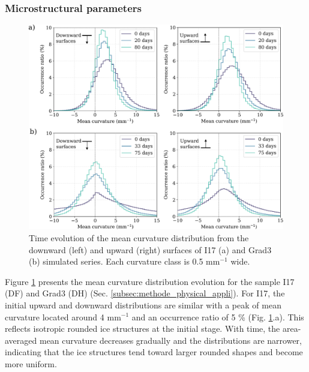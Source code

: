 \documentclass[draft,ms]{agujournal2019}
\begin{document}
\subsubsection{Microstructural parameters}

\begin{figure}
    \centering
    \includegraphics[width=\linewidth]{Figures/histo_i17_grad3_copie_invert.pdf}
    \caption{Time evolution of the mean curvature distribution from the downward (left) and upward (right) surfaces of I17 (a) and Grad3 (b) simulated series. Each curvature class is 0.5 mm$^{-1}$ wide.}
    \label{fig:histo_i17_grad3}
\end{figure}

Figure \ref{fig:histo_i17_grad3} presents the mean curvature distribution evolution for the sample I17 (DF) and Grad3 (DH) (Sec. \ref{subsec:methode_physical_appli}). For I17, the initial upward and downward distributions are similar with a peak of mean curvature located around 4 mm$^{-1}$ and an occurrence ratio of 5 \% (Fig. \ref{fig:histo_i17_grad3}.a). This reflects isotropic rounded ice structures at the initial stage. With time, the area-averaged mean curvature decreases gradually and the distributions are narrower, indicating that the ice structures tend toward larger rounded shapes and become more uniform.\\
\end{document}
